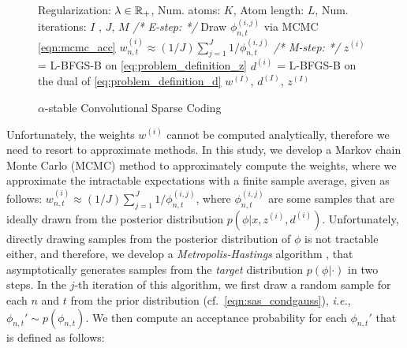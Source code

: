 
 
%

\begin{figure}
\vspace{-10pt}
    \begin{minipage}{0.52\textwidth}
    \begin{algorithm}[H]
      \begin{algorithmic}[1] %
      \REQUIRE Regularization: $\lambda \in \mathbb{R}_+$, Num. atoms: $K$, Atom length: $L$, Num. iterations: $I$ , $J$, $M$
          \STATE \textit{\color{blue} /* E-step: */} %
          \STATE Draw $\phi_{n,t}^{(i,j)}$ via MCMC \eqref{eqn:mcmc_acc}
          \ENDFOR
          \STATE $w_{n,t}^{(i)} \approx (1/J) \sum\nolimits_{j=1}^{J} 1/{\phi_{n,t}^{(i,j)}}$
          \STATE \textit{\color{blue} /* M-step: */} %
                  \STATE $z^{(i)}$ = L-BFGS-B on \eqref{eq:problem_definition_z}
                  \STATE $d^{(i)}$ = L-BFGS-B on the dual of \eqref{eq:problem_definition_d}
              \ENDFOR
        \ENDFOR
        \RETURN $w^{(I)}$, $d^{(I)}$, $z^{(I)}$
        \end{algorithmic}
        \caption{$\alpha$-stable Convolutional Sparse Coding}
        \label{alg:alpha_csc}
    \end{algorithm}
\end{minipage}
\vspace{-20pt}
\end{figure}
Unfortunately, the weights $w^{(i)}$ cannot be computed analytically, therefore we need to resort to
approximate methods. In this study, we develop a Markov chain Monte Carlo (MCMC) method to approximately compute the weights, where we approximate the intractable expectations with a finite sample average, given as follows: $w_{n,t}^{(i)} \approx (1/{J}) \sum_{j=1}^{J} 1/{\phi_{n,t}^{(i,j)}}$, where $\phi_{n,t}^{(i,j)}$ are some samples that are ideally drawn from the posterior distribution $p(\phi|x,z^{(i)},d^{(i)})$. Unfortunately, directly drawing samples from the posterior distribution of $\phi$ is not tractable either, and therefore, we develop a \emph{Metropolis-Hastings} algorithm \cite{chib1995understanding}, that asymptotically generates samples from the \emph{target} distribution $p(\phi|\cdot)$ in two steps. In the $j$-th iteration of this algorithm, we first draw a random sample for each $n$ and $t$ from the prior distribution (cf.\ \eqref{eqn:sas_condgauss}), \textit{i.e.}, $\phi_{n,t}'\sim p(\phi_{n,t})$. We then compute an acceptance probability for each $\phi_{n,t}'$ that is defined as follows:
